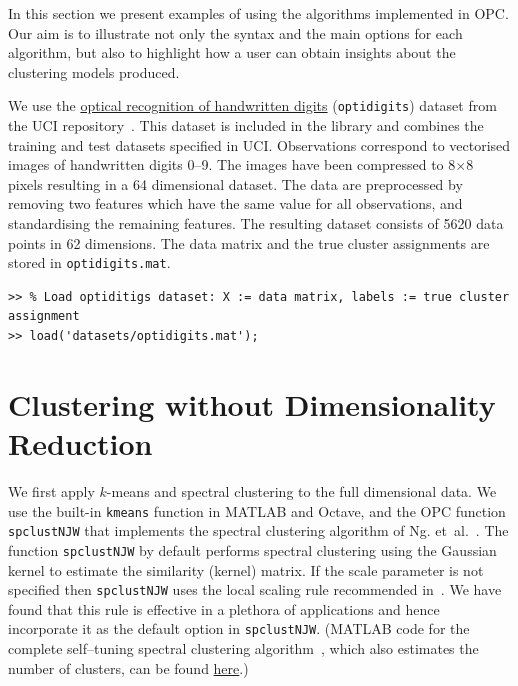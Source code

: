 \documentclass{book}
\begin{document}
In this section we present examples of using the algorithms
implemented in OPC. Our aim is to illustrate not only the syntax and the main options
for each algorithm, but also to highlight how a user can obtain insights about
the clustering models produced.

We use the \href{https://archive.ics.uci.edu/ml/datasets/optical+recognition+of+handwritten+digits}
{optical recognition of handwritten digits} ({\tt optidigits}) dataset
from the UCI repository~\cite{UCI}. This dataset is included in the library and
combines the training and test datasets specified in UCI. 
%
Observations correspond to
vectorised images of handwritten digits 0--9. The images have been compressed
to 8$\times$8 pixels resulting in a 64 dimensional dataset.
%
The data are preprocessed by removing two features which have the same value for all
observations, and standardising the remaining features. The resulting dataset consists of
5620 data points in 62 dimensions. The data matrix and the true cluster
assignments are stored in {\tt optidigits.mat}.

\begin{verbatim}
>> % Load optiditigs dataset: X := data matrix, labels := true cluster assignment
>> load('datasets/optidigits.mat');
\end{verbatim}


\section{Clustering without Dimensionality Reduction}

We first apply $k$-means and spectral clustering to the full dimensional data.
We use the built-in {\tt kmeans} function in MATLAB and Octave, and the OPC
function {\tt spclustNJW} that implements the spectral clustering algorithm of
Ng.  et~al.~\cite{NgJW2001}. 
%
The function {\tt spclustNJW} by default performs spectral clustering using
the Gaussian kernel to estimate the similarity (kernel) matrix.
%
If the scale parameter is not specified then {\tt spclustNJW} uses the local scaling
rule recommended in~\cite{Zelnik2004}. We have found that this
rule is effective in a plethora of applications and hence incorporate it
as the default option in {\tt spclustNJW}. (MATLAB code for the complete
self--tuning spectral clustering algorithm~\cite{Zelnik2004},
which also
estimates the number of clusters, can be found
\href{http://lihi.eew.technion.ac.il/files/Demos/SelfTuningClustering.html}{here}.)
\end{document}
